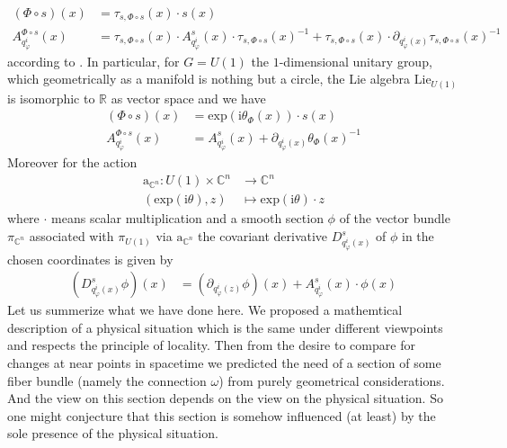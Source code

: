 \begin{enumerate}
\begin{align*}
  (\Phi \circ s)(x)
  &=
  \tau_{s,\Phi \circ s}(x)
  \cdot
  s(x)
  \\
  A_{q_{\varphi}^{i}}^{\Phi \circ s}(x)
  &=
  \tau_{s,\Phi \circ s}(x)
  \cdot
  A_{q_{\varphi}^{i}}^{s}(x)
  \cdot
  \tau_{s,\Phi \circ s}(x)^{-1}
  +
  \tau_{s,\Phi \circ s}(x)
  \cdot
  \partial_{q_{\varphi}^{i}(x)}
  \tau_{s,\Phi \circ s}(x)^{-1}
\end{align*}
according to \cite{797789bc}. In particular, for $G = U(1)$ the $1$-dimensional unitary group, which geometrically as a manifold is nothing but a circle, the Lie algebra $\mathrm{Lie}_{U(1)}$ is isomorphic to $\mathbb{R}$ as vector space and we have
\begin{align*}
  (\Phi \circ s)(x)
  &=
  \mathrm{exp}(\mathrm{i}\theta_{\Phi}(x))
  \cdot
  s(x)
  \\
  A_{q_{\varphi}^{i}}^{\Phi \circ s}(x)
  &=
  A_{q_{\varphi}^{i}}^{s}(x)
  +
  \partial_{q_{\varphi}^{i}(x)}
  \theta_{\Phi}(x)^{-1}
\end{align*}
Moreover for the action
\begin{align*}
  \mathrm{a}_{\mathbb{C}^{n}}
  \colon
  U(1)
  \times
  \mathbb{C}^{n}
  &\rightarrow
  \mathbb{C}^{n}
  \\
  (\mathrm{exp}(\mathrm{i}\theta),z)
  &\mapsto
  \mathrm{exp}(\mathrm{i}\theta)
  \cdot
  z
\end{align*}
where $\cdot$ means scalar multiplication and a smooth section $\phi$ of the vector bundle $\pi_{\mathbb{C}^{n}}$ associated with $\pi_{U(1)}$ via $\mathrm{a}_{\mathbb{C}^{n}}$ the covariant derivative $D_{q_{\varphi}^{i}(x)}^{s}$ of $\phi$ in the chosen coordinates is given by
\begin{align*}
  \left(
    D_{q_{\varphi}^{i}(x)}^{s}
    \phi
  \right)
  (x)
  &=
  \left(
    \partial_{q_{\varphi}^{i}(z)}
    \phi
  \right)
  (x)
  +
  A_{q_{\varphi}^{i}}^{s}(x)
  \cdot
  \phi(x)
\end{align*}
Let us summerize what we have done here. We proposed a mathemtical description of a physical situation which is the same under different viewpoints and respects the principle of locality. Then from the desire to compare for changes at near points in spacetime we predicted the need of a section of some fiber bundle (namely the connection $\omega$) from purely geometrical considerations. And the view on this section depends on the view on the physical situation. So one might conjecture that this section is somehow influenced (at least) by the sole presence of the physical situation.

\end{enumerate}
